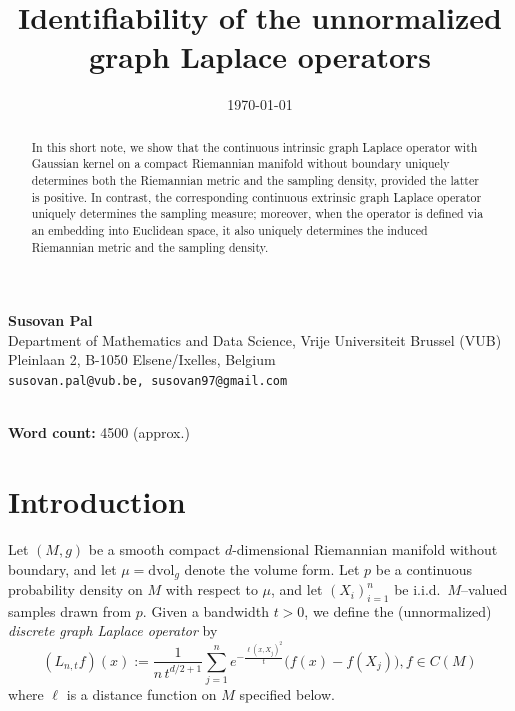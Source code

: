 \documentclass{amsart}
\theoremstyle{definition}
\theoremstyle{remark}
\newcommand{\nd}{\noindent}
\newcommand{\0}{\boldsymbol{0}}
\begin{document}

\title[Identifiability properties of the unnormalized graph Laplace operators]{\large \textbf{Identifiability of the unnormalized graph Laplace operators}}
\date{\today}


\maketitle
\begin{center}
  \textbf{Susovan Pal} \\
  Department of Mathematics and Data Science, Vrije Universiteit Brussel (VUB) \\
  Pleinlaan 2, B-1050 Elsene/Ixelles, Belgium \\
  \texttt{susovan.pal@vub.be, susovan97@gmail.com}
  
\end{center}
\begin{abstract}
 In this short note, we show that the continuous intrinsic graph Laplace operator with Gaussian kernel on a compact Riemannian manifold without boundary uniquely determines both the Riemannian metric and the sampling density, provided the latter is positive. In contrast, the corresponding continuous extrinsic graph Laplace operator uniquely determines the sampling measure; moreover, when the operator is defined via an embedding into Euclidean space, it also uniquely determines the induced Riemannian metric and the sampling density.
\end{abstract}

\nd {}\\
\smallskip
\nd \textbf{Word count:} 4500 (approx.)

\section{Introduction}

\nd Let $(M,g)$ be a smooth compact $d$-dimensional Riemannian manifold without boundary, and let
$\mu=\mathrm{dvol}_g$ denote the volume form. Let $p$ be a continuous probability density on $M$ with respect to
$\mu$, and let $(X_i)_{i=1}^n$ be i.i.d.\ $M$--valued samples drawn from $p$. Given a bandwidth $t>0$,
we define the (unnormalized) \textit{discrete graph Laplace operator} by
\begin{equation}\label{eq:discrete_GL}
(L_{n,t} f)(x)
:= \frac{1}{n\,t^{d/2+1}} \sum_{j=1}^n
e^{-\frac{\ell(x,X_j)^2}{t}}\big(f(x)-f(X_j)\big), f \in C(M)
\end{equation}
where $\ell$ is a distance function on $M$ specified below.
\end{document}
